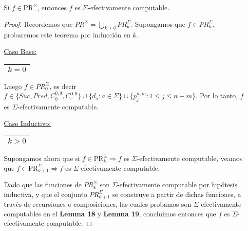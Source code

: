   \begin{theorem}
    \PN Si $f \in \mathrm{PR}^{\Sigma}$, entonces $f$ es $\Sigma$-efectivamente computable.
  \end{theorem}
  \begin{proof}
    \PN Recordemos que $PR^{\Sigma} = \bigcup\limits_{k \geq 0} PR_{k}^{\Sigma}$. Supongamos que $f \in
    PR_{k}^{\Sigma}$, probaremos este teorema por inducción en $k$.

    \vspace{3mm}
    \PN \underline{Caso Base:} \begin{tabular}{|c|} \hline $k = 0$ \\\hline \end{tabular}

    \PN Luego $f \in PR_{0}^{\Sigma}$, es decir $f \in \{Suc, Pred, C_{0}^{0,0}, C_{\varepsilon}^{0,0}\} \cup \{d_{a}:
    a \in \Sigma\} \cup \{p_{j}^{n,m} : 1 \leq j \leq n+m\}$. Por lo tanto, $f$ es $\Sigma$-efectivamente computable.

    \vspace{3mm}
		\PN \underline{Caso Inductivo:} \begin{tabular}{|c|} \hline $k > 0$ \\\hline \end{tabular}

    \PN Supongamos ahora que si $f \in \mathrm{PR}_{k}^{\Sigma} \Rightarrow f$ es
    $\Sigma$-efectivamente computable, veamos que $f \in \mathrm{PR}_{k+1}^{\Sigma} \Rightarrow f$ es
    $\Sigma$-efectivamente computable.

    \PN Dado que las funciones de $PR_{k}^{\Sigma}$ son $\Sigma$-efectivamente computable por hipótesis inductiva, y
    que el conjunto $PR_{k+1}^{\Sigma}$ se construye a partir de dichas funciones, a través de recursiones o
    composiciones, las cuales probamos son $\Sigma$-efectivamente computables en el \textbf{Lemma 18} y
    \textbf{Lemma 19}, concluimos entonces que $f$ es $\Sigma$-efectivamente computable.
  \end{proof}

